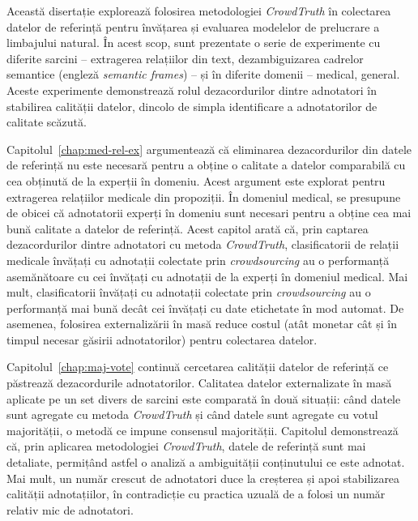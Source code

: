 Această disertație explorează folosirea metodologiei \textit{CrowdTruth} în colectarea datelor de referință pentru învățarea și evaluarea modelelor de prelucrare a limbajului natural. În acest scop, sunt prezentate o serie de experimente cu diferite sarcini -- extragerea relațiilor din text, dezambiguizarea cadrelor semantice (engleză \textit{semantic frames}) -- și în diferite domenii -- medical, general. Aceste experimente demonstrează rolul dezacordurilor dintre adnotatori în stabilirea calității datelor, dincolo de simpla identificare a adnotatorilor de calitate scăzută.

Capitolul~\ref{chap:med-rel-ex} argumentează că eliminarea dezacordurilor din datele de referință nu este necesară pentru a obține o calitate a datelor comparabilă cu cea obținută de la experții în domeniu. Acest argument este explorat pentru extragerea relațiilor medicale din propoziții. În domeniul medical, se presupune de obicei că adnotatorii experți în domeniu sunt necesari pentru a obține cea mai bună calitate a datelor de referință. Acest capitol arată că, prin captarea dezacordurilor dintre adnotatori cu metoda \textit{CrowdTruth}, clasificatorii de relații medicale învățați cu adnotații colectate prin \textit{crowdsourcing} au o performanță asemănătoare cu cei învățați cu adnotații de la experți în domeniul medical. Mai mult, clasificatorii învățați cu adnotații colectate prin \textit{crowdsourcing} au o performanță mai bună decât cei învățați cu date etichetate în mod automat. De asemenea, folosirea externalizării în masă reduce costul (atât monetar cât și în timpul necesar găsirii adnotatorilor) pentru colectarea datelor.

Capitolul~\ref{chap:maj-vote} continuă cercetarea calității datelor de referință ce păstrează dezacordurile adnotatorilor. Calitatea datelor externalizate în masă aplicate pe un set divers de sarcini este comparată în două situații: când datele sunt agregate cu metoda \textit{CrowdTruth} și când datele sunt agregate cu votul majorității, o metodă ce impune consensul majorității. Capitolul demonstrează că, prin aplicarea metodologiei \textit{CrowdTruth}, datele de referință sunt mai detaliate, permițând astfel o analiză a ambiguității conținutului ce este adnotat. Mai mult, un număr crescut de adnotatori duce la creșterea și apoi stabilizarea calității adnotațiilor, în contradicție cu practica uzuală de a folosi un număr relativ mic de adnotatori.

